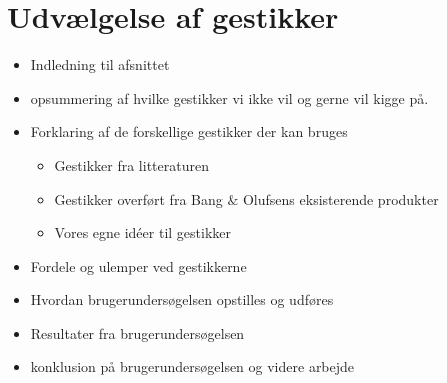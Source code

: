 \chapter{Udvælgelse af gestikker}
\label{UdvaelgelseAfGestikker}
%
\begin{itemize}
  \item Indledning til afsnittet
  \item opsummering af hvilke gestikker vi ikke vil og gerne vil kigge på.
  \item Forklaring af de forskellige gestikker der kan bruges
  \begin{itemize}
  	\item Gestikker fra litteraturen
  	\item Gestikker overført fra Bang $\&$ Olufsens eksisterende produkter
  	\item Vores egne idéer til gestikker
  \end{itemize}
  \item Fordele og ulemper ved gestikkerne
  \item Hvordan brugerundersøgelsen opstilles og udføres
  \item Resultater fra brugerundersøgelsen
  \item konklusion på brugerundersøgelsen og videre arbejde
\end{itemize}